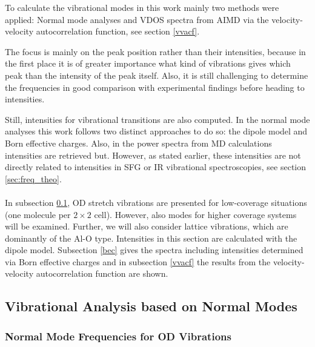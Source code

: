 \documentclass[11pt,DIV=13,BCOR=5mm,a4paper,headinclude]{scrbook}
\begin{document}
To calculate the vibrational modes in this work mainly two methods were applied: Normal mode analyses and VDOS spectra from AIMD via the velocity-velocity autocorrelation function, see section \ref{vvacf}.


The focus is mainly on the peak position rather than their intensities, because in the first place it is of greater importance what kind of vibrations gives which peak than the intensity of the peak itself.
Also, it is still challenging to determine the frequencies in good comparison with experimental findings before heading to intensities.

Still, intensities for vibrational transitions are also computed.
In the normal mode analyses this work follows two distinct approaches to do so: the dipole model and Born effective charges.
Also, in the power spectra from MD calculations intensities are retrieved but.
However, as stated earlier, these intensities are not directly related to intensities in SFG or IR vibrational spectroscopies, see section \ref{sec:freq_theo}.
\\\\

In subsection \ref{nma}, OD stretch vibrations are presented for low-coverage situations (one molecule per $2\times 2$ cell).
However, also modes for higher coverage systems will be examined.
Further, we will also consider lattice vibrations, which are dominantly of the Al-O type.
Intensities in this section are calculated with the dipole model.
Subsection \ref{bec} gives the spectra including intensities determined via Born effective charges and in subsection \ref{vvacf} the results from the velocity-velocity autocorrelation function are shown.


\subsection{Vibrational Analysis based on Normal Modes}\label{nma}
\subsubsection{Normal Mode Frequencies for OD Vibrations}
\end{document}

